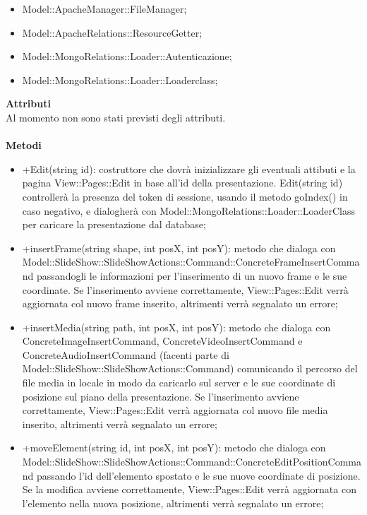 {{\begin{itemize}
\begin{itemize}
							\item Invoker;
						\end{itemize}
						\item Model::ApacheManager::FileManager;
						\item Model::ApacheRelations::ResourceGetter;
						\item Model::MongoRelations::Loader::Autenticazione;
						\item Model::MongoRelations::Loader::Loaderclass;
					\end{itemize}
					\textbf{Attributi}\\
					\indent Al momento non sono stati previsti degli attributi.\\\\
					\textbf{Metodi}
					\begin{itemize}
						\item +Edit(string id):  costruttore che dovrà inizializzare gli eventuali attibuti e la pagina View::Pages::Edit in base all'id della presentazione. Edit(string id) controllerà la presenza del token di sessione, usando il metodo goIndex() in caso negativo, e dialogherà con Model::MongoRelations::Loader::LoaderClass per caricare la presentazione dal database;
						\item +insertFrame(string shape, int posX, int posY): metodo che dialoga con Model::SlideShow::SlideShowActions::Command::ConcreteFrameInsertCommand passandogli le informazioni per l'inserimento di un nuovo frame e le sue coordinate. Se l'inserimento avviene correttamente, View::Pages::Edit verrà aggiornata col nuovo frame inserito, altrimenti verrà segnalato un errore;
						\item +insertMedia(string path, int posX, int posY): metodo che dialoga con ConcreteImageInsertCommand, ConcreteVideoInsertCommand e ConcreteAudioInsertCommand (facenti parte di Model::SlideShow::SlideShowActions::Command) comunicando il percorso del file media in locale in modo da caricarlo sul server e le sue coordinate di posizione sul piano della presentazione. Se l'inserimento avviene correttamente, View::Pages::Edit verrà aggiornata col nuovo file media inserito, altrimenti verrà segnalato un errore;
						\item +moveElement(string id, int posX, int posY): metodo che dialoga con Model::SlideShow::SlideShowActions::Command::ConcreteEditPositionCommand passando l'id dell'elemento spostato e le sue nuove coordinate di posizione. Se la modifica avviene correttamente, View::Pages::Edit verrà aggiornata con l'elemento nella nuova posizione, altrimenti verrà segnalato un errore;

\end{itemize}}}
